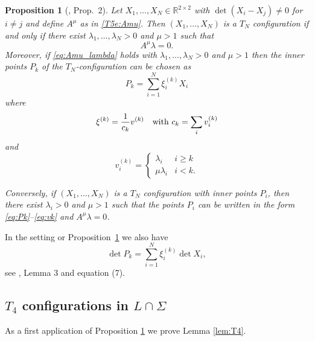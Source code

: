 \documentclass[titlepage]{amsart}
\numberwithin{equation}{section}
\theoremstyle{plain}
\newtheorem{proposition}[equation]{Proposition}
\theoremstyle{definition}
\theoremstyle{remark}
\newcommand{\R}{\mathbb{R}}
\begin{document}
\begin{proposition}[\cite{szekelyhidi05}, Prop.\ 2]    \label{pr:criterion_TN}
Let $X_1, \ldots,  X_N \in  \R^{2 \times 2}$    with $\det (X_i - X_j) \ne 0$ for $i \ne j$ and define $A^\mu$ as in \eqref{T5e:Amu}. 
Then $(X_1, \ldots, X_N)$ is a $T_N$ configuration if and only if there exist $\lambda_1, \ldots, \lambda_N > 0$
and $\mu > 1$ such that 
\begin{equation}  \label{eq:Amu_lambda}
A^\mu \lambda = 0.
\end{equation}
Moreover, if  \eqref{eq:Amu_lambda} holds with 
$\lambda_1, \ldots, \lambda_N> 0$
and $\mu > 1$ then the inner points $P_k$ of the $T_N$-configuration  can be chosen as
\begin{equation} \label{eq:Pk}
P_k = \sum_{i=1}^N  \xi^{(k)}_i X_i
\end{equation}
where
\begin{equation} \label{eq:xik}
\xi^{(k)} = \frac1{c_k} v^{(k)} \quad \text{with $ c_k = \sum_{i} v_i^{(k)}$}
\end{equation}
and
\begin{equation} \label{eq:vk}
v^{(k)}_i = \begin{cases}\lambda_i & i\geq k\\ \mu\lambda_i & i< k.\end{cases}
\end{equation}

Conversely, if $(X_1, \ldots, X_N)$ is a $T_N$ configuration with inner points $P_i$, then there exist $\lambda_i > 0$ and $\mu > 1$ such that the 
points $P_i$ can be written in the form  \eqref{eq:Pk}--\eqref{eq:vk} and $A^\mu \lambda = 0$.
\end{proposition}


 In the setting or Proposition~\ref{pr:criterion_TN} we also have
\begin{equation}  \label{eq:det_Pk}
\det P_k = \sum_{i=1}^N  \xi^{(k)}_i \det X_i,
\end{equation}
see \cite{szekelyhidi05}, Lemma 3 and equation (7).


\subsection{$T_4$ configurations in $L\cap\Sigma$}\label{sec:T4ex}
As a first application of Proposition \ref{pr:criterion_TN} we prove Lemma \ref{lem:T4}. 
\end{document}
